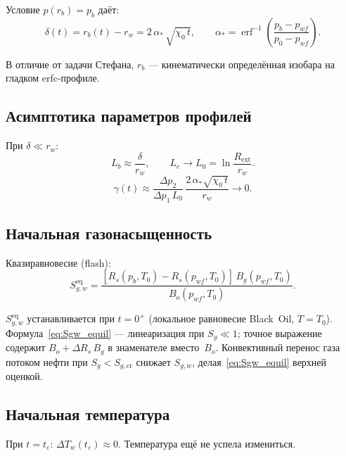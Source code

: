 \documentclass[12pt,a4paper]{article}
\newcommand{\ext}{\mathrm{ext}}
\begin{document}
Условие $p(r_b) = p_b$ даёт:
\begin{equation}\label{eq:delta_sqrt}
  \boxed{
    \delta(t) = r_b(t) - r_w = 2\,\alpha_*\,\sqrt{\chi_0\,t},
    \qquad
    \alpha_* = \operatorname{erf}^{-1}\!\left(
      \frac{p_b - p_{wf}}{p_0 - p_{wf}}
    \right).
  }
\end{equation}

В отличие от задачи Стефана, $r_b$ --- кинематически
определённая изобара на гладком erfc-профиле.

\subsection{Асимптотика параметров профилей}

При $\delta \ll r_w$:
\begin{equation}\label{eq:Lb_asymp}
  L_b \approx \frac{\delta}{r_w},
  \qquad
  L_e \to L_0 = \ln\!\frac{R_\ext}{r_w}.
\end{equation}
\begin{equation}\label{eq:gamma_asymp}
  \gamma(t)
  \approx \frac{\Delta p_2}{\Delta p_1\,L_0}\,
    \frac{2\,\alpha_*\sqrt{\chi_0\,t}}{r_w} \to 0.
\end{equation}

\subsection{Начальная газонасыщенность}

Квазиравновесие (flash):
\begin{equation}\label{eq:Sgw_equil}
  \boxed{
    S_{g,w}^{\mathrm{eq}}
    = \frac{[R_s(p_b, T_0) - R_s(p_{wf}, T_0)]\,
      B_g(p_{wf}, T_0)}{B_o(p_{wf}, T_0)}.
  }
\end{equation}

$S_{g,w}^{\mathrm{eq}}$ устанавливается при $t = 0^+$
(локальное равновесие Black~Oil, $T = T_0$).
Формула~\eqref{eq:Sgw_equil} --- линеаризация при $S_g \ll 1$;
точное выражение содержит $B_o + \Delta R_s\,B_g$
в знаменателе вместо~$B_o$.
Конвективный перенос газа потоком нефти
при $S_g < S_{g,\mathrm{cr}}$ снижает $S_{g,w}$,
делая~\eqref{eq:Sgw_equil} верхней оценкой.

\subsection{Начальная температура}

При $t = t_\varepsilon$: $\Delta T_w(t_\varepsilon) \approx 0$.
Температура ещё не успела измениться.
\end{document}
